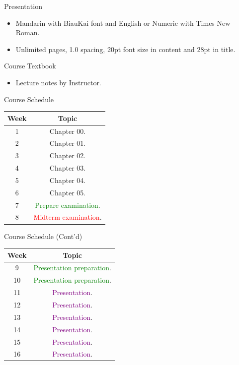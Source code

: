 \documentclass{beamer}
\begin{document}
\begin{frame}{Presentation}
\begin{itemize}
\item Mandarin with BiauKai font and English or Numeric with Times New Roman.
\item Unlimited pages, 1.0 spacing, 20pt font size in content and 28pt in title.
\end{itemize}
\end{frame}
\begin{frame}{Course Textbook}
\begin{itemize}
\item Lecture notes by Instructor.
\end{itemize}
\end{frame}
\begin{frame}{Course Schedule}
\begin{center}
\begin{tabular}{|c|c|}
\hline
Week & Topic \\
\hline
1 & Chapter 00.\\
\hline
2 & Chapter 01.\\
\hline
3 & Chapter 02.\\
\hline
4 & Chapter 03.\\
\hline
5 & Chapter 04.\\
\hline
6 & Chapter 05.\\
\hline
7 & \textcolor{Green}{Prepare examination}.\\
\hline
8 & \textcolor{red}{Midterm examination}.\\
\hline
\end{tabular}
\end{center}
\end{frame}
\begin{frame}{Course Schedule (Cont'd)}
\begin{center}
\begin{tabular}{|c|c|}
\hline
Week & Topic \\
\hline
9 & \textcolor{Green}{Presentation preparation}.\\
\hline
10 & \textcolor{Green}{Presentation preparation}.\\
\hline
11 & \textcolor{purple}{Presentation}.\\
\hline
12 & \textcolor{purple}{Presentation}.\\
\hline
13 & \textcolor{purple}{Presentation}.\\
\hline
14 & \textcolor{purple}{Presentation}.\\
\hline
15 & \textcolor{purple}{Presentation}.\\
\hline
16 & \textcolor{purple}{Presentation}.\\
\hline
\end{tabular}
\end{center}
\end{frame}
\end{document}
